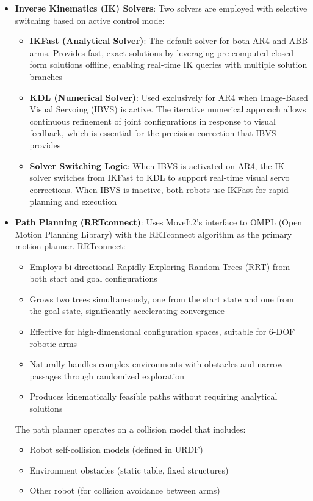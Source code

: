 \begin{itemize}
    \item \textbf{Inverse Kinematics (IK) Solvers}: Two solvers are employed with selective switching based on active control mode:
    \begin{itemize}
        \item \textbf{IKFast (Analytical Solver)}: The default solver for both AR4 and ABB arms. Provides fast, exact solutions by leveraging pre-computed closed-form solutions offline, enabling real-time IK queries with multiple solution branches
        \item \textbf{KDL (Numerical Solver)}: Used exclusively for AR4 when Image-Based Visual Servoing (IBVS) is active. The iterative numerical approach allows continuous refinement of joint configurations in response to visual feedback, which is essential for the precision correction that IBVS provides
        \item \textbf{Solver Switching Logic}: When IBVS is activated on AR4, the IK solver switches from IKFast to KDL to support real-time visual servo corrections. When IBVS is inactive, both robots use IKFast for rapid planning and execution
    \end{itemize}
        
    \item \textbf{Path Planning (RRTconnect)}: Uses MoveIt2's interface to OMPL (Open Motion Planning Library) with the RRTconnect algorithm as the primary motion planner. RRTconnect:
    \begin{itemize}
        \item Employs bi-directional Rapidly-Exploring Random Trees (RRT) from both start and goal configurations
        \item Grows two trees simultaneously, one from the start state and one from the goal state, significantly accelerating convergence
        \item Effective for high-dimensional configuration spaces, suitable for 6-DOF robotic arms
        \item Naturally handles complex environments with obstacles and narrow passages through randomized exploration
        \item Produces kinematically feasible paths without requiring analytical solutions
    \end{itemize}
    
    The path planner operates on a collision model that includes:
    \begin{itemize}
        \item Robot self-collision models (defined in URDF)
        \item Environment obstacles (static table, fixed structures)
        \item Other robot (for collision avoidance between arms)
    \end{itemize}
    

\end{itemize}

